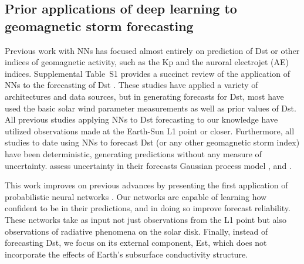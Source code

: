 \documentclass[draft,linenumbers]{agujournal2018}
\begin{document}
\subsection{Prior applications of deep learning to geomagnetic storm forecasting}\label{sec:prior_work}
Previous work with NNs has focused almost entirely on prediction of Dst or other indices of geomagnetic activity, such as the Kp and the auroral electrojet (AE) indices. Supplemental Table~S1 provides a succinct review of the application of NNs to the forecasting of Dst \citep{Andriyas2015, Bala2012, Gleisner1996, Jankovivcova2002, Kugblenu1999, Lazzus2017, Munsami2000, Pallocchia2006, Revallo2014, Sharifie2006, Stepanova2005, Stepanova2000, Wei2007, Wu1996, Wu1997a}. These studies have applied a variety of architectures and data sources, but in generating forecasts for Dst, most have used the basic solar wind parameter measurements as well as prior values of Dst. All previous studies applying NNs to Dst forecasting to our knowledge have utilized observations made at the Earth-Sun L1 point or closer. Furthermore,  all studies to date using NNs to forecast Dst (or any other geomagnetic storm index) have been deterministic, generating predictions without any measure of uncertainty. \cite{Gruet2018}  assess uncertainty in their forecasts  Gaussian process model , and . 

This work improves on previous advances by presenting the first application of probabilistic neural networks . Our networks are capable of learning how confident to be in their predictions, and in doing so improve forecast reliability. These networks take as input not just observations from the L1 point but also observations of radiative phenomena on the solar disk. Finally, instead of forecasting Dst, we focus on its external component, Est, which does not incorporate the effects of Earth's subsurface conductivity structure.
\end{document}
